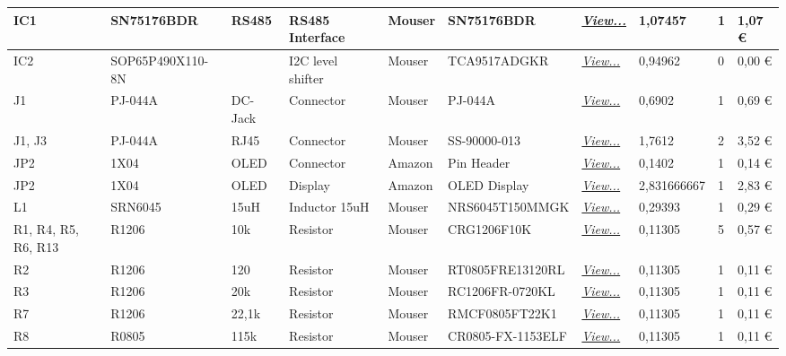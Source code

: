 \begin{table}[H]
{\begin{tabular}{|l|l|l|l|l|l|l|l|l|l|}
			IC1 & SN75176BDR & RS485 & RS485 Interface & Mouser & SN75176BDR & \href{https://www.mouser.de/ProductDetail/595-SN75176BDR}{\textit{View...}} & 1,07457 & 1 & 1,07 € \\ \hline
			IC2 & SOP65P490X110-8N &  & I2C level shifter & Mouser & TCA9517ADGKR & \href{https://www.mouser.de/ProductDetail/Texas-Instruments/TCA9517ADGKR?qs=\%252BrH4t\%252BeVZ2M4pVnwXR4oNA\%3D\%3D}{\textit{View...}} & 0,94962 & 0 & 0,00 € \\ \hline
			J1 & PJ-044A & DC-Jack & Connector & Mouser & PJ-044A & \href{https://www.mouser.de/ProductDetail/490-PJ-044A}{\textit{View...}} & 0,6902 & 1 & 0,69 € \\ \hline
			J1, J3 & PJ-044A & RJ45 & Connector & Mouser & SS-90000-013 & \href{https://www.mouser.de/ProductDetail/530-SS-90000-013}{\textit{View...}} & 1,7612 & 2 & 3,52 € \\ \hline
			JP2 & 1X04 & OLED & Connector & Amazon & Pin Header & \href{https://www.amazon.de/dp/B09NJMBBLX?ref\_=ppx\_hzsearch\_conn\_dt\_b\_fed\_asin\_title\_3\&th=1}{\textit{View...}} & 0,1402 & 1 & 0,14 € \\ \hline
			JP2 & 1X04 & OLED & Display & Amazon & OLED Display & \href{https://www.amazon.de/dp/B09J7T5SCL?ref\_=ppx\_hzsearch\_conn\_dt\_b\_fed\_asin\_title\_4}{\textit{View...}} & 2,831666667 & 1 & 2,83 € \\ \hline
			L1 & SRN6045 & 15uH & Inductor 15uH & Mouser & NRS6045T150MMGK & \href{https://www.mouser.de/ProductDetail/963-NRS6045T150MMGK}{\textit{View...}} & 0,29393 & 1 & 0,29 € \\ \hline
			R1, R4, R5, R6, R13 & R1206 & 10k & Resistor & Mouser & CRG1206F10K & \href{https://www.mouser.de/ProductDetail/279-CRG1206F10K}{\textit{View...}} & 0,11305 & 5 & 0,57 € \\ \hline
			R2 & R1206 & 120 & Resistor & Mouser & RT0805FRE13120RL & \href{https://www.mouser.de/ProductDetail/603-RT0805FRE13120RL}{\textit{View...}} & 0,11305 & 1 & 0,11 € \\ \hline
			R3 & R1206 & 20k & Resistor & Mouser & RC1206FR-0720KL & \href{https://www.mouser.de/ProductDetail/603-RC1206FR-0720KL}{\textit{View...}} & 0,11305 & 1 & 0,11 € \\ \hline
			R7 & R1206 & 22,1k & Resistor & Mouser & RMCF0805FT22K1 & \href{https://www.mouser.de/ProductDetail/708-RMCF0805FT22K1}{\textit{View...}} & 0,11305 & 1 & 0,11 € \\ \hline
			R8 & R0805 & 115k & Resistor & Mouser & CR0805-FX-1153ELF & \href{https://www.mouser.de/ProductDetail/652-CR0805FX-1153ELF}{\textit{View...}} & 0,11305 & 1 & 0,11 € \\ \hline

\end{tabular}}
\end{table}
